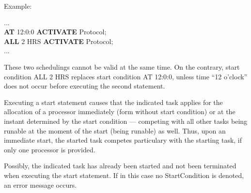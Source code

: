 Example:

...\\
{\bf AT} 12:0:0 {\bf ACTIVATE} Protocol; \\
{\bf ALL} 2 HRS {\bf ACTIVATE} Protocol; \\
...

These two schedulings cannot be valid at the same time. On the contrary,
start condition ALL 2 HRS replaces start condition AT 12:0:0, unless
time ``12 o'clock'' does not occur before executing the second
statement.


Executing %
 a start statement causes that the indicated task
applies for the allocation of a processor immediately (form without
start condition) or at the instant determined by the start condition ---
competing with all other tasks being runable at the moment
of the start (being runable) as well. Thus, upon an immediate start,
the started task competes particulary with the starting task, if only
one processor is provided.

Possibly, the indicated task has already been started and not been
terminated when executing the start statement. If in this case no
StartCondition is denoted, an error message occurs.

